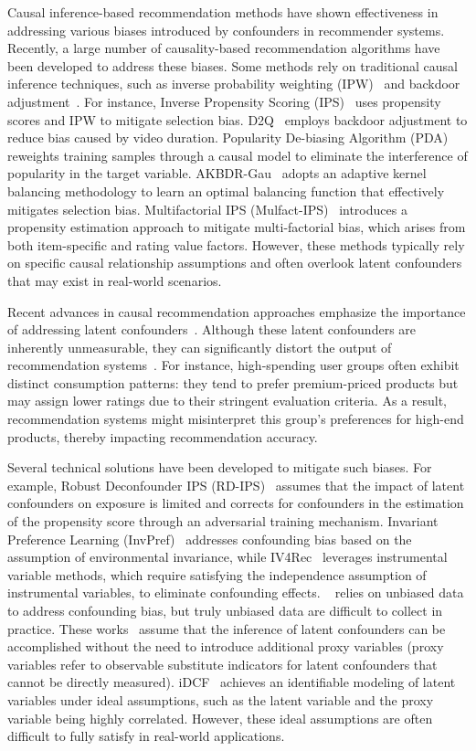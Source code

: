 \documentclass[sigconf]{acmart}
\begin{document}
Causal inference-based recommendation methods have shown effectiveness in addressing various biases introduced by confounders in recommender systems. 
Recently, a large number of causality-based recommendation algorithms have been developed to address these biases. 
Some methods rely on traditional causal inference techniques, such as inverse probability weighting (IPW)~\cite{23} and backdoor adjustment~\cite{20}. For instance, Inverse Propensity Scoring (IPS)~\cite{23} uses propensity scores and IPW to mitigate selection bias. D2Q~\cite{34} employs backdoor adjustment to reduce bias caused by video duration. Popularity De-biasing Algorithm (PDA)~\cite{35} reweights training samples through a causal model to eliminate the interference of popularity in the target variable. 
AKBDR-Gau~\cite{li2024debiased} adopts an adaptive kernel balancing methodology to learn an optimal balancing function that effectively mitigates selection bias.
Multifactorial IPS (Mulfact-IPS)~\cite{huang2024going} introduces a propensity estimation approach to mitigate multi-factorial bias, which arises from both item-specific and rating value factors.
However, these methods typically rely on specific causal relationship assumptions and often overlook latent confounders that may exist in real-world scenarios.

Recent advances in causal recommendation approaches emphasize the importance of addressing latent confounders~\cite{idcf,23}. Although these latent confounders are inherently unmeasurable, they can significantly distort the output of recommendation systems~\cite{20,cheng2022local,cheng2024data}. For instance, high-spending user groups often exhibit distinct consumption patterns: they tend to prefer premium-priced products but may assign lower ratings due to their stringent evaluation criteria. As a result, recommendation systems might misinterpret this group’s preferences for high-end products, thereby impacting recommendation accuracy.

Several technical solutions have been developed to mitigate such biases.
For example, Robust Deconfounder IPS (RD-IPS)~\cite{4} assumes that the impact of latent confounders on exposure is limited and corrects for confounders in the estimation of the propensity score through an adversarial training mechanism. 
Invariant Preference Learning (InvPref)~\cite{30} addresses confounding bias based on the assumption of environmental invariance, while IV4Rec~\cite{IV-serach-data} leverages instrumental variable methods, which require satisfying the independence assumption of instrumental variables, to eliminate confounding effects. ~\cite{li2023balancing} relies on unbiased data to address  confounding bias, but truly unbiased data are difficult to collect in practice. These works~\cite{29,38} assume that the inference of latent confounders can be accomplished without the need to introduce additional proxy variables (proxy variables refer to observable substitute indicators for latent confounders that cannot be directly measured).
iDCF~\cite{idcf} achieves an identifiable modeling of latent variables under ideal assumptions, such as the latent variable and the proxy variable being highly correlated. 
However, these ideal assumptions are often difficult to fully satisfy in real-world applications.
\end{document}
